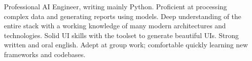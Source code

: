 

\begin{cvparagraph}

  Professional AI Engineer, writing mainly Python. Proficient at processing complex data and generating reports using models.\newline
  Deep understanding of the entire stack with a working knowledge of many modern architectures and technologies.\newline
  Solid UI skills with the toolset to generate beautiful UIs.\newline
  Strong written and oral english. Adept at group work; comfortable quickly learning new frameworks and codebases.\newline
\end{cvparagraph}
